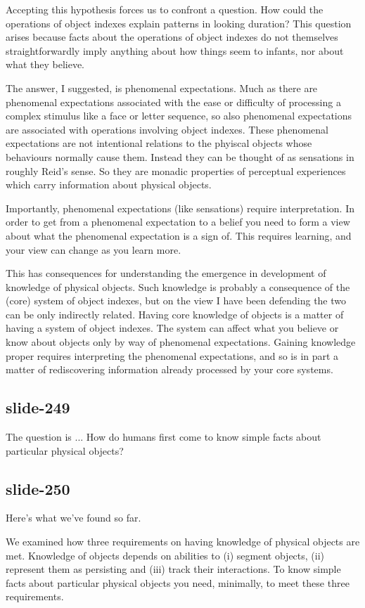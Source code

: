 \documentclass[12pt,\papersize]{extarticle}
\begin{document}
Accepting this hypothesis forces us to confront a question.
How could the operations of object indexes explain patterns in looking
duration?
This question arises because
facts about the operations of object indexes do not themselves
straightforwardly imply anything about how things seem to infants, nor about
what they believe.

The answer, I suggested, is phenomenal expectations.
Much as there are phenomenal expectations associated with the ease or
difficulty of processing a complex stimulus like a face or letter sequence,
so also phenomenal expectations are associated with operations involving
object indexes.
These phenomenal expectations are not intentional relations to
the phyiscal objects whose behaviours normally cause them.
Instead they can be thought of as sensations in roughly Reid’s sense.
So they are monadic properties of perceptual experiences which carry
information about physical objects.

Importantly, phenomenal expectations (like sensations) require
interpretation.
In order to get from a phenomenal expectation to a belief you need to
form a view about what the phenomenal expectation is a sign of.
This requires learning, and your view can change as you learn more.

This has consequences for understanding the emergence in
development of knowledge of physical objects.
Such knowledge is probably a consequence of the (core) system of
object indexes, but on the view I have been defending the two can be only
indirectly related.
Having core knowledge of objects is a matter of having a system of object
indexes.
The system can affect what you believe or know about objects only by way
of phenomenal expectations.
Gaining knowledge proper requires interpreting the phenomenal expectations,
and so is in part a matter of rediscovering information already processed
by your core systems.

\subsection{slide-249}
The question is ...
How do humans first come to know simple facts about particular physical objects?

\subsection{slide-250}
Here’s what we’ve found so far.

We examined how three requirements on having knowledge of physical objects are met.
Knowledge of objects depends on abilities to (i) segment objects, (ii) represent them as
persisting and (iii) track their interactions.
To know simple facts about particular physical objects you need, minimally,
to meet these three requirements.
\end{document}
